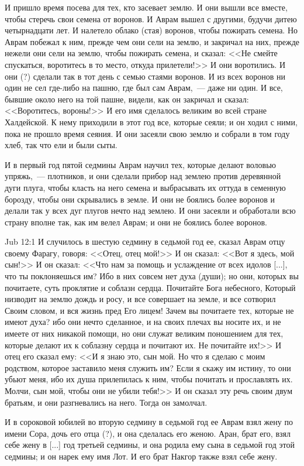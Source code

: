 И пришло время посева для тех, кто засевает
землю. И они вышли все вместе, чтобы стеречь свои
семена от воронов. И Аврам вышел с другими, будучи
дитею четырнадцати лет. И налетело облако (стая)
воронов, чтобы пожирать семена. Но Аврам побежал
к ним, прежде чем они сели на землю, и закричал на
них, прежде нежели они сели на землю, чтобы
пожирать семена, и сказал: <<Не смейте
спускаться, воротитесь в то место, откуда
прилетели!>> И они воротились. И они (?) сделали
так в тот день с семью стаями воронов. И из всех
воронов ни один не сел где-либо на пашню, где был
сам Аврам,~--- даже ни один. И все, бывшие около него
на той пашне, видели, как он закричал и сказал:
<<Воротитесь, вороны!>> И его имя сделалось
великим во всей стране Халдейской. К нему
приходили в этот год все, которые сеяли; и он
ходил с ними, пока не прошло время сеяния. И они
засеяли свою землю и собрали в том году хлеб, так
что ели и были сыты.

И в первый год пятой седмины Аврам научил тех,
которые делают воловью упряжь,~--- плотников, и они
сделали прибор над землею против деревянной дуги
плуга, чтобы класть на него семена и выбрасывать
их оттуда в семенную борозду, чтобы они
скрывались в земле. И они не боялись более
воронов и делали так у всех дуг плугов нечто над
землею. И они засеяли и обработали всю страну
вполне так, как им велел Аврам; и они не боялись
более воронов.

\vs Jub 12:1
И случилось в шестую седмину в седьмой год ее,
сказал Аврам отцу своему Фарагу, говоря: <<Отец,
отец мой!>> И он сказал: <<Вот я здесь, мой
сын!>> И он сказал: <<Что нам за помощь и
услаждение от всех идолов [...], что ты
поклоняешься им? Ибо в них совсем нет духа (души);
но они, которых вы почитаете, суть проклятие и
соблазн сердца. Почитайте Бога небесного,
Который низводит на землю дождь и росу, и все
совершает на земле, и все сотворил Своим словом, и
вся жизнь пред Его лицем! Зачем вы почитаете тех,
которые не имеют духа? ибо они нечто сделанное, и
на своих плечах вы носите их, и не имеете от них
никакой помощи, но они служат великим поношением
для тех, которые делают их к соблазну сердца и
почитают их. Не почитайте их!>> И отец его сказал
ему: <<И я знаю это, сын мой. Но что я сделаю с
моим родством, которое заставило меня служить им?
Если я скажу им истину, то они убьют меня, ибо их
душа прилепилась к ним, чтобы почитать и
прославлять их. Молчи, сын мой, чтобы они не убили
тебя!>> И он сказал эту речь своим двум братьям,
и они разгневались на него. Тогда он замолчал.

И в сороковой юбилей во вторую седмину в
седьмой год ее Аврам взял жену по имени Сора, дочь
его отца (?), и она сделалась его женою. Аран, брат
его, взял себе жену в [...] год третьей седмины,
и она родила ему сына в седьмой год этой седмины;
и он нарек ему имя Лот. И его брат Накгор также
взял себе жену.

